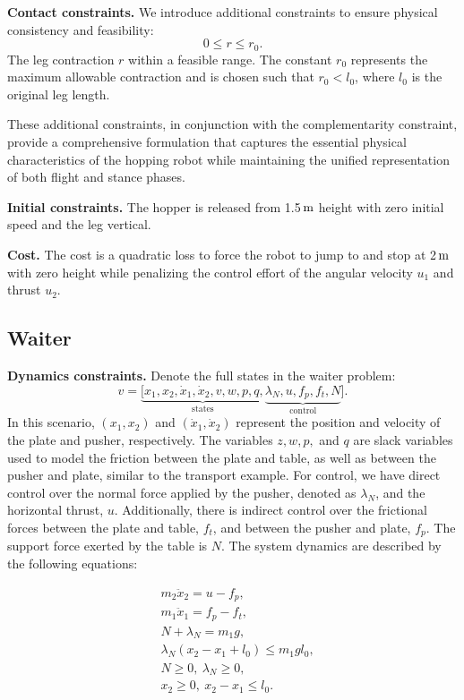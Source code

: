 \textbf{Contact constraints. }
We introduce additional constraints to ensure physical consistency and feasibility:
\begin{equation}
    0 \leq r \leq r_0 \label{eq:2dhopper_leg_length}.
\end{equation}
The leg contraction $r$ within a feasible range. The constant $r_0$ represents the maximum allowable contraction and is chosen such that $r_0 < l_0$, where $l_0$ is the original leg length.

These additional constraints, in conjunction with the complementarity constraint, provide a comprehensive formulation that captures the essential physical characteristics of the hopping robot while maintaining the unified representation of both flight and stance phases.

\textbf{Initial constraints. }
The hopper is released from 1.5\,$\textup{m}$ height with zero initial speed and the leg vertical.

\textbf{Cost. }
The cost is a quadratic loss to force the robot to jump to and stop at 2\,$\textup{m}$ with zero height while penalizing the control effort of the angular velocity $u_1$ and thrust $u_2$.

\subsection{Waiter}\label{app:formulation-waiter}
\textbf{Dynamics constraints. }
Denote the full states in the waiter problem:
$$v = \underbrace{[x_1, x_2, \dot{x}_1, \dot{x}_2, v, w,p,q ,}_{\text{states}} \underbrace{\lambda_N, u,f_p,f_t, N}_{\text{control}}].$$
In this scenario, \((x_1, x_2)\) and \((\dot{x}_1, \dot{x}_2)\) represent the position and velocity of the plate and pusher, respectively. The variables \(z, w, p,\) and \(q\) are slack variables used to model the friction between the plate and table, as well as between the pusher and plate, similar to the transport example. For control, we have direct control over the normal force applied by the pusher, denoted as \(\lambda_N\), and the horizontal thrust, \(u\). Additionally, there is indirect control over the frictional forces between the plate and table, \(f_t\), and between the pusher and plate, \(f_p\). The support force exerted by the table is \(N\). The system dynamics are described by the following equations:

\begin{subequations}\label{eq:waiter}
    \begin{align}
    & m_2 \ddot{x}_2 = u - f_p, \\
    & m_1 \ddot{x}_1 = f_p - f_t, \\
    & N + \lambda_N = m_1 g, \label{eq:waiter:staticforcebalance} \\
    & \lambda_N (x_2 - x_1 + l_0) \leq m_1 g l_0, \label{eq:waiter:torquebalance} \\
    & N \geq 0, \ \lambda_N \geq 0, \\
    & x_2 \geq 0, \ x_2 - x_1 \leq l_0. \label{eq:waiter:pusherposlimit}
    \end{align}
\end{subequations}


